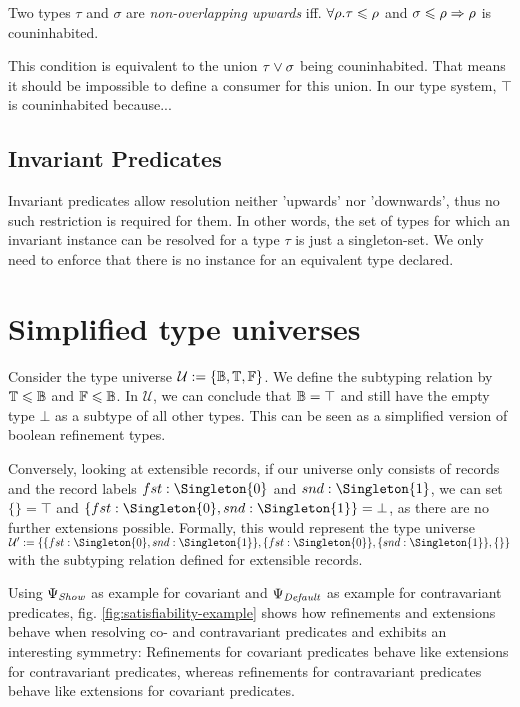 \begin{definition}
  Two types $\tau$ and $\sigma$ are \emph{non-overlapping upwards} iff. $\forall\rho. \tau \leqslant \rho$ and $\sigma \leqslant \rho \Rightarrow \rho$ is couninhabited.
\end{definition}

This condition is equivalent to the union $\tau \vee \sigma$ being couninhabited.
That means it should be impossible to define a consumer for this union. %
In our type system, $\top$ is couninhabited because...

\subsection{Invariant Predicates}

Invariant predicates allow resolution neither 'upwards' nor 'downwards', thus no such restriction is required for them.
In other words, the set of types for which an invariant instance can be resolved for a type $\tau$ is just a singleton-set.
We only need to enforce that there is no instance for an equivalent type declared.



\section{Simplified type universes}

Consider the type universe $\mathcal{U} := \{ \mathbb{B}, \mathbb{T}, \mathbb{F} \}$.
We define the subtyping relation by $\mathbb{T} \leqslant \mathbb{B}$ and $\mathbb{F} \leqslant \mathbb{B}$.
In $\mathcal{U}$, we can conclude that $\mathbb{B} = \top$ and still have the empty type $\bot$ as a subtype of all other types.
This can be seen as a simplified version of boolean refinement types. \cite{springer}

Conversely, looking at extensible records, if our universe only consists of records and the record labels $fst : \Singleton{0}$ and $snd : \Singleton{1}$, we can set $\{\} = \top$ and $\{ fst : \Singleton{0}, snd : \Singleton{1} \} = \bot$, as there are no further extensions possible.
Formally, this would represent the type universe $\mathcal{U}' := \{ \{ fst : \Singleton{0}, snd : \Singleton{1} \}, \{ fst : \Singleton{0} \}, \{ snd : \Singleton{1} \}, \{\} \}$ with the subtyping relation defined for extensible records. %

Using $\Psi_\mathit{Show}$ as example for covariant and $\Psi_\mathit{Default}$ as example for contravariant predicates, fig. \ref{fig:satisfiability-example} shows how refinements and extensions behave when resolving co- and contravariant predicates and exhibits an interesting symmetry:
Refinements for covariant predicates behave like extensions for contravariant predicates, whereas refinements for contravariant predicates behave like extensions for covariant predicates.

